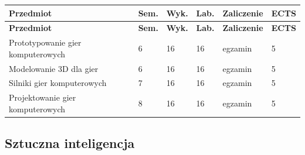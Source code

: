 \documentclass[12pt,a4paper]{article}
\newcommand{\thdrule}{\noalign{\global\setlength{\extrarowheight}{0pt}}}
\newcommand{\thdend}{\noalign{\global\setlength{\extrarowheight}{4pt}}}
\begin{document}
{\scriptsize
\begin{longtable}{m{6.5cm}m{0.7cm}m{1cm}m{1cm}m{1.7cm}m{0.7cm}}
\thdrule\toprule
\rowcolor{pjatkRed}
{\color{white}\footnotesize\textbf{\vphantom{Ag}Przedmiot}} & {\color{white}\footnotesize\textbf{\vphantom{Ag}Sem.}} & {\color{white}\footnotesize\textbf{\vphantom{Ag}Wyk.}} & {\color{white}\footnotesize\textbf{\vphantom{Ag}Lab.}} & {\color{white}\footnotesize\textbf{\vphantom{Ag}Zaliczenie}} & {\color{white}\footnotesize\textbf{\vphantom{Ag}ECTS}} \\
\midrule\thdend
\endfirsthead
\thdrule\toprule
\rowcolor{pjatkRed}
{\color{white}\footnotesize\textbf{\vphantom{Ag}Przedmiot}} & {\color{white}\footnotesize\textbf{\vphantom{Ag}Sem.}} & {\color{white}\footnotesize\textbf{\vphantom{Ag}Wyk.}} & {\color{white}\footnotesize\textbf{\vphantom{Ag}Lab.}} & {\color{white}\footnotesize\textbf{\vphantom{Ag}Zaliczenie}} & {\color{white}\footnotesize\textbf{\vphantom{Ag}ECTS}} \\
\midrule\thdend
\endhead
\rowcolor{tableRowLight} Prototypowanie gier komputerowych & 6 & 16 & 16 & {\scriptsize egzamin} & 5 \\
\rowcolor{tableRowAlt} Modelowanie 3D dla gier & 6 & 16 & 16 & {\scriptsize egzamin} & 5 \\
\rowcolor{tableRowLight} Silniki gier komputerowych & 7 & 16 & 16 & {\scriptsize egzamin} & 5 \\
\rowcolor{tableRowAlt} Projektowanie gier komputerowych & 8 & 16 & 16 & {\scriptsize egzamin} & 5 \\
\bottomrule
\end{longtable}}

\subsection*{Sztuczna inteligencja}
\end{document}
